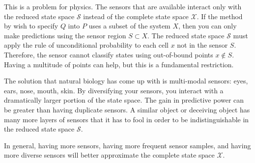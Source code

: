 \documentclass[10pt, a5paper, twoside, openright]{memoir}
\begin{document}
This is a problem for physics. The sensors that are available interact only with the reduced state space $\mathcal S$ instead of the complete state space $\mathcal X$. If the method by wish to specify $Q$ into $P$ uses a subset of the system $X$, then you can only make predictions using the sensor region $S \subset X$. The reduced state space $\mathcal S$ must apply the rule of unconditional probability to each cell $x$ not in the sensor $S$. Therefore, the sensor cannot classify states using out-of-bound points $x \notin S$. Having a multitude of points can help, but this is a fundamental restriction.

The solution that natural biology has come up with is multi-modal sensors: eyes, ears, nose, mouth, skin. By diversifying your sensors, you interact with a dramatically larger portion of the state space. The gain in predictive power can be greater than having duplicate sensors. A similar object or deceiving object has many more layers of sensors that it has to fool in order to be indistinguishable in the reduced state space $\mathcal S$.
 
In general, having more sensors, having more frequent sensor samples, and having more diverse sensors will better approximate the complete state space $\mathcal X$.

\backmatter

\printindex
\end{document}
